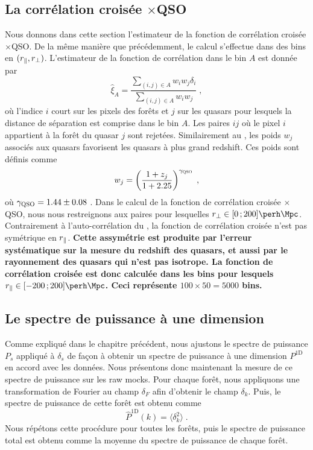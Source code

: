 \documentclass[11pt, twoside, a4paper, openright]{report}
\begin{document}
\subsection{La corrélation croisée \lya{}$\times$QSO}
Nous donnons dans cette section l'estimateur de la fonction de corrélation croisée \lya{}$\times$QSO. De la même manière que précédemment, le calcul s'effectue dans des bins en $(r_{\parallel}{}, r_{\perp}{})$. L'estimateur de la fonction de corrélation dans le bin $A$ est donnée par
\begin{equation}
  \label{eq:xiqf}
\hat  \xi_A = \frac{
    \sum\limits_{(i,j)\in A} w_i w_j \delta_i
  }{
    \sum\limits_{(i,j)\in A} w_i w_j
  }
  \; ,
\end{equation}
où l'indice $i$ court sur les pixels des forêts et $j$ sur les quasars pour lesquels la distance de séparation est comprise dans le bin $A$. Les paires $ij$ où le pixel $i$ appartient à la forêt du quasar $j$ sont rejetées.
Similairement au \lya{}, les poids $w_j$ associés aux quasars favorisent les quasars à plus grand redshift. Ces poids sont définis comme
\begin{equation}
  \label{eq:weights3}
  w_j = \left(\frac{1 + z_j}{1 + \num{2.25}}\right)^{\gamma_{\textsc{QSO}}} \; ,
\end{equation}
où $\gamma_{\textsc{QSO}} = \num{1.44} \pm \num{0.08}$ \autocite{Bourboux2019}. Dans le calcul de la fonction de corrélation croisée \lya{}$\times$QSO, nous nous restreignons aux paires pour lesquelles $\rperp{} \in [0 \, ; 200] \si{\perh\Mpc}$.
Contrairement à l'auto-corrélation du \lya{}, la fonction de corrélation croisée n'est pas symétrique en $r_{\parallel}{}$.
\textbf{Cette assymétrie est produite par l'erreur systématique sur la mesure du redshift des quasars, et aussi par le rayonnement des quasars qui n'est pas isotrope.
La fonction de corrélation croisée est donc calculée dans les bins pour lesquels $\rpar{} \in [-200 \, ; 200] \si{\perh\Mpc}$. Ceci représente $100 \times 50 = \num{5000}$ bins.
}


\subsection{Le spectre de puissance à une dimension}
Comme expliqué dans le chapitre précédent, nous ajustons le spectre de puissance $P_{s}$ appliqué à $\delta_s$ de façon à obtenir un spectre de puissance à une dimension $P^{\mathrm{1D}}$ en accord avec les données. Nous présentons donc maintenant la mesure de ce spectre de puissance sur les raw mocks. Pour chaque forêt, nous appliquons une transformation de Fourier au champ $\delta_F$ afin d'obtenir le champ $\delta_k$. Puis, le spectre de puissance de cette forêt est obtenu comme
\begin{equation}
\hat  P^{\mathrm{1D}}(k) = \langle \delta_k^2 \rangle \; .
\end{equation}
Nous répétons cette procédure pour toutes les forêts, puis le spectre de puissance total est obtenu comme la moyenne du spectre de puissance de chaque forêt.
\end{document}

